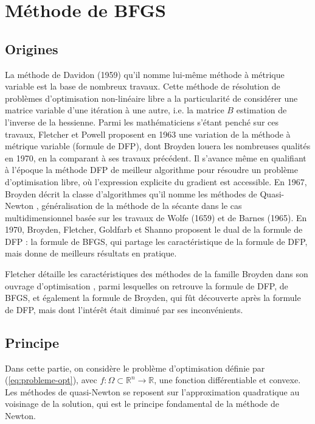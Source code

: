\documentclass[3p, twocolumn]{elsarticle}
\begin{document}
\section{Méthode de BFGS}

\subsection{Origines}
La méthode de Davidon (1959)\cite{art:Davidon_1991} qu'il nomme lui-même méthode à métrique variable est la base de nombreux travaux. Cette méthode de résolution de problèmes d'optimisation non-linéaire libre a la particularité de considérer une matrice variable d'une itération à une autre, i.e. la matrice $B$ estimation de l'inverse de la hessienne. Parmi les mathématiciens s'étant penché sur ces travaux, Fletcher et Powell proposent en 1963 une variation de la méthode à métrique variable (formule de DFP), dont Broyden louera les nombreuses qualités en 1970, en la comparant à ses travaux précédent. Il s'avance même en qualifiant à l'époque la méthode DFP de meilleur algorithme pour résoudre un problème d'optimisation libre, où l'expression explicite du gradient est accessible. En 1967, Broyden décrit la classe d'algorithmes qu'il nomme les méthodes de Quasi-Newton \cite{art:Broyden_1967}, généralisation de la méthode de la sécante dans le cas multidimensionnel basée sur les travaux de Wolfe (1659) et de Barnes (1965). En 1970, Broyden, Fletcher, Goldfarb et Shanno proposent le dual de la formule de DFP : la formule de BFGS, qui partage les caractéristique de la formule de DFP, mais donne de meilleurs résultats en pratique.

\begin{rmk}
    Fletcher détaille les caractéristiques des méthodes de la famille Broyden dans son ouvrage d'optimisation \cite{book:Fletcher_1987}, parmi lesquelles on retrouve la formule de DFP, de BFGS, et également la formule de Broyden, qui fût découverte après la formule de DFP, mais dont l'intérêt était diminué par ses inconvénients.
\end{rmk}

\subsection{Principe}
Dans cette partie, on considère le problème d'optimisation définie par (\ref{eq:probleme-opt}), avec $f:\Omega\subset \mathbb{R}^n\rightarrow \mathbb{R}$, une fonction différentiable et convexe. 
Les méthodes de quasi-Newton se reposent sur l'approximation quadratique au voisinage de la solution, qui est le principe fondamental de la méthode de Newton.
\end{document}
